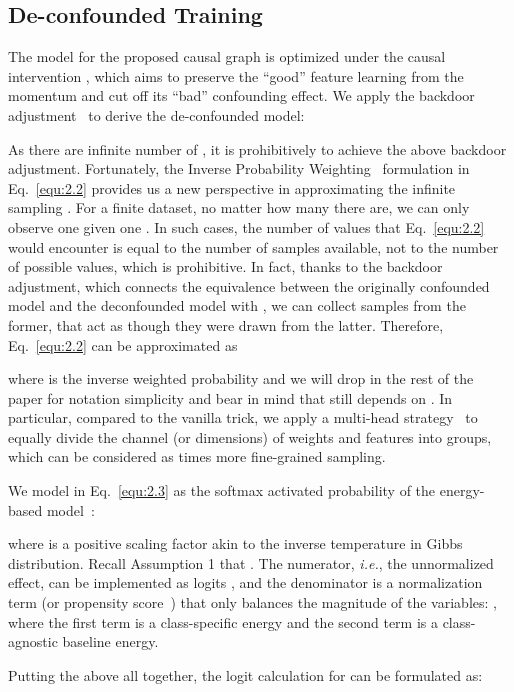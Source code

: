 \documentclass{article}
\newcommand{\ie}{\textit{i.e.}}
\begin{document}
\subsection{De-confounded Training}
\label{subsec: deconfound}
The model for the proposed causal graph is optimized under the causal intervention , which aims to preserve the ``good'' feature learning from the momentum and cut off its ``bad'' confounding effect. We apply the backdoor adjustment~\cite{pearl1995causal} to derive the de-confounded model:

As there are infinite number of , it is prohibitively to achieve the above backdoor adjustment. Fortunately, the Inverse Probability Weighting~\cite{pearl2016causal} formulation in Eq.~\eqref{equ:2.2} provides us a new perspective in approximating the infinite sampling . For a finite dataset, no matter how many  there are, we can only observe one  given one . In such cases, the number of  values that Eq.~\eqref{equ:2.2} would encounter is equal to the number of samples  available, not to the number of possible  values, which is prohibitive. In fact, thanks to the backdoor adjustment, which connects the equivalence between the originally confounded model  and the deconfounded model  with , we can collect samples from the former, that act as though they were drawn from the latter. Therefore, Eq.~\eqref{equ:2.2} can be approximated as

where  is the inverse weighted probability and we will drop  in the rest of the paper for notation simplicity and bear in mind that  still depends on . In particular, compared to the vanilla trick, we apply a multi-head strategy~\cite{vaswani2017attention} to equally divide the channel (or dimensions) of weights and features into  groups, which can be considered as  times more fine-grained sampling. 

We model  in Eq.~\eqref{equ:2.3} as the softmax activated probability of the energy-based model~\cite{lecun2006tutorial}:

where  is a positive scaling factor akin to the inverse temperature in Gibbs distribution. Recall Assumption 1 that . The numerator, \ie, the unnormalized effect, can be implemented as logits , and the denominator is a normalization term (or propensity score~\cite{austin2011introduction}) that only balances the magnitude of the variables:  , where the first term is a class-specific energy and the second term is a class-agnostic baseline energy.

Putting the above all together, the logit calculation for  can be formulated as:
\end{document}
